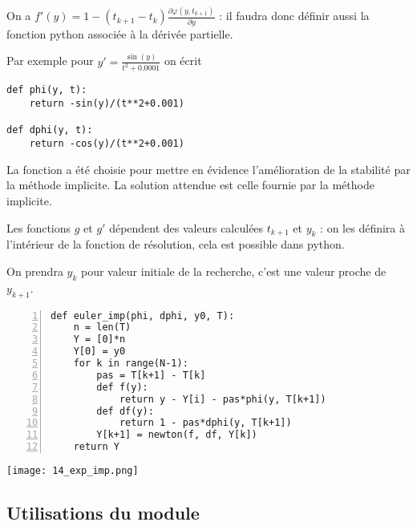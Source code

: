 On a $\displaystyle f'(y) = 1 - (t_{k+1}-t_k) \frac{\partial \varphi(y, t_{k+1})}{\partial y}$ : il faudra donc définir aussi la fonction python associée à la dérivée partielle.

Par exemple pour $\displaystyle y' = \frac{\sin(y)}{t^2+0.0001}$ on écrit

\medskip
\begin{lstlisting}
def phi(y, t):
    return -sin(y)/(t**2+0.001)

def dphi(y, t):
    return -cos(y)/(t**2+0.001)
\end{lstlisting}
La fonction a été choisie pour mettre en évidence l'amélioration de la stabilité par la méthode implicite. La solution attendue est celle fournie par la méthode implicite.

\medskip


Les fonctions $g$ et $g'$ dépendent des valeurs calculées $t_{k+1}$ et $y_k$ : on les définira à l'intérieur de la fonction de résolution, cela est possible dans python.

On prendra $y_k$ pour valeur initiale de la recherche, c'est une valeur proche de $y_{k+1}$.
\begin{lstlisting}[numbers=left, caption=Euler implicite]
def euler_imp(phi, dphi, y0, T):
    n = len(T)   
    Y = [0]*n            
    Y[0] = y0           
    for k in range(N-1):  
        pas = T[k+1] - T[k]
        def f(y):
            return y - Y[i] - pas*phi(y, T[k+1])
        def df(y):
            return 1 - pas*dphi(y, T[k+1])
        Y[k+1] = newton(f, df, Y[k])
    return Y
\end{lstlisting}
\begin{center}
\texttt{[image: 14\_exp\_imp.png]}
\end{center}
\subsection{Utilisations du module }
